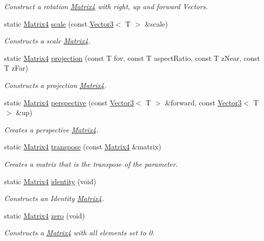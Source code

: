 \begin{DoxyCompactItemize}
\begin{DoxyCompactList}\small\item\em Construct a rotation \hyperlink{classsparky_1_1_matrix4}{Matrix4} with right, up and forward Vectors. \end{DoxyCompactList}\item 
static \hyperlink{classsparky_1_1_matrix4}{Matrix4} \hyperlink{classsparky_1_1_matrix4_ada9820297b26753f42b3c2e59bd299a0}{scale} (const \hyperlink{classsparky_1_1_vector3}{Vector3}$<$ T $>$ \&scale)
\begin{DoxyCompactList}\small\item\em Constructs a scale \hyperlink{classsparky_1_1_matrix4}{Matrix4}. \end{DoxyCompactList}\item 
static \hyperlink{classsparky_1_1_matrix4}{Matrix4} \hyperlink{classsparky_1_1_matrix4_ac014eec14c47300aa06f5ded2a765e48}{projection} (const T fov, const T aspect\+Ratio, const T z\+Near, const T z\+Far)
\begin{DoxyCompactList}\small\item\em Constructs a projection \hyperlink{classsparky_1_1_matrix4}{Matrix4}. \end{DoxyCompactList}\item 
static \hyperlink{classsparky_1_1_matrix4}{Matrix4} \hyperlink{classsparky_1_1_matrix4_a91336e1edb14a733f22b2bbbd00d22cf}{perspective} (const \hyperlink{classsparky_1_1_vector3}{Vector3}$<$ T $>$ \&forward, const \hyperlink{classsparky_1_1_vector3}{Vector3}$<$ T $>$ \&up)
\begin{DoxyCompactList}\small\item\em Creates a perspective \hyperlink{classsparky_1_1_matrix4}{Matrix4}. \end{DoxyCompactList}\item 
static \hyperlink{classsparky_1_1_matrix4}{Matrix4} \hyperlink{classsparky_1_1_matrix4_a99ff7119842c847500ff00bbef12cf4c}{transpose} (const \hyperlink{classsparky_1_1_matrix4}{Matrix4} \&matrix)
\begin{DoxyCompactList}\small\item\em Creates a matrix that is the transpose of the parameter. \end{DoxyCompactList}\item 
static \hyperlink{classsparky_1_1_matrix4}{Matrix4} \hyperlink{classsparky_1_1_matrix4_a0c11da6de697550bccdbf7de0976b08e}{identity} (void)
\begin{DoxyCompactList}\small\item\em Constructs an Identity \hyperlink{classsparky_1_1_matrix4}{Matrix4}. \end{DoxyCompactList}\item 
static \hyperlink{classsparky_1_1_matrix4}{Matrix4} \hyperlink{classsparky_1_1_matrix4_a0d539e58ec7bc94471867577bf388d5a}{zero} (void)
\begin{DoxyCompactList}\small\item\em Constructs a \hyperlink{classsparky_1_1_matrix4}{Matrix4} with all elements set to 0. \end{DoxyCompactList}\end{DoxyCompactItemize}
